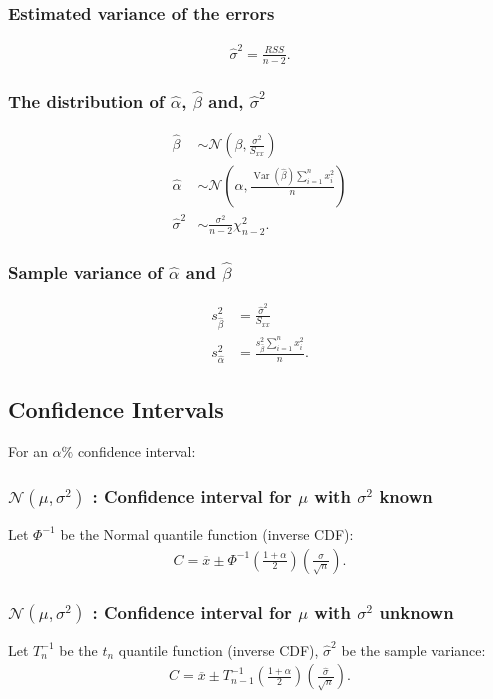 \documentclass[a4paper, 12pt, twoside]{article}
\DeclareMathOperator{\Var}{Var}
\begin{document}
\subsubsection{Estimated variance of the errors}
\begin{gather*}
    \hat\sigma^2 = \frac{RSS}{n - 2}.
\end{gather*}

\subsubsection{The distribution of $\hat\alpha$, $\hat\beta$
    and, $\hat\sigma^2$}
\begin{align*}
    \hat\beta    & \sim \mathcal{N}\left(\beta,
    \frac{\sigma^2}{S_{xx}}\right)                            \\
    \hat\alpha   & \sim \mathcal{N}\left(\alpha,
    \frac{\Var(\hat\beta) \sum_{i = 1}^n x_i^2}{n}\right)     \\
    \hat\sigma^2 & \sim \frac{\sigma^2}{n - 2}\chi^2_{n - 2}.
\end{align*}

\subsubsection{Sample variance of $\hat\alpha$ and $\hat\beta$}
\begin{align*}
    s_{\hat\beta}^2  & = \frac{\hat\sigma^2}{S_{xx}}                   \\
    s_{\hat\alpha}^2 & = \frac{s_{\hat\beta}^2 \sum_{i=1}^n x_i^2}{n}.
\end{align*}

\subsection{Confidence Intervals}
For an $\alpha\%$ confidence interval:

\subsubsection{$\mathcal{N}(\mu, \sigma^2)$ : Confidence
    interval for $\mu$ with $\sigma^2$ known}
Let $\Phi^{-1}$ be the Normal quantile function (inverse CDF):
\begin{align*}
    C = \overline{x} \pm \Phi^{-1}\left(\frac{1 + \alpha}{2}\right)
    \left(\frac{\sigma}{\sqrt{n}}\right).
\end{align*}

\subsubsection{$\mathcal{N}(\mu, \sigma^2)$ : Confidence
    interval for $\mu$ with $\sigma^2$ unknown}
Let $T^{-1}_{n}$ be the $t_{n}$ quantile function (inverse CDF),
$\hat\sigma^2$ be the sample variance:
\begin{align*}
    C = \overline{x} \pm T^{-1}_{n-1}\left(\frac{1 + \alpha}{2}\right)
    \left(\frac{\hat\sigma}{\sqrt{n}}\right).
\end{align*}
\end{document}
